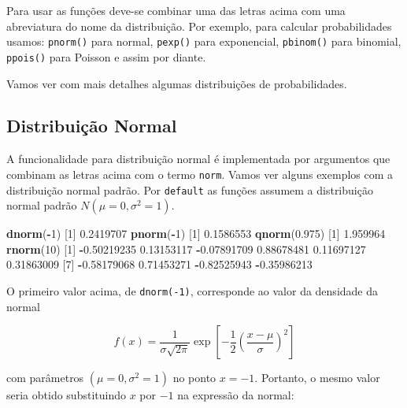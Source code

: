 \documentclass[10pt,a4paper]{book}
\newenvironment{Shaded}{\begin{snugshade}}{\end{snugshade}}
\newcommand{\KeywordTok}[1]{\textcolor[rgb]{0.13,0.29,0.53}{\textbf{#1}}}
\newcommand{\DecValTok}[1]{\textcolor[rgb]{0.00,0.00,0.81}{#1}}
\newcommand{\FloatTok}[1]{\textcolor[rgb]{0.00,0.00,0.81}{#1}}
\newcommand{\OperatorTok}[1]{\textcolor[rgb]{0.81,0.36,0.00}{\textbf{#1}}}
\newcommand{\NormalTok}[1]{#1}
\begin{document}
Para usar as funções deve-se combinar uma das letras acima com uma
abreviatura do nome da distribuição. Por exemplo, para calcular
probabilidades usamos: \texttt{pnorm()} para normal, \texttt{pexp()}
para exponencial, \texttt{pbinom()} para binomial, \texttt{ppois()} para
Poisson e assim por diante.

Vamos ver com mais detalhes algumas distribuições de probabilidades.

\subsection{Distribuição Normal}\label{distribuiuxe7uxe3o-normal}

A funcionalidade para distribuição normal é implementada por argumentos
que combinam as letras acima com o termo \texttt{norm}. Vamos ver alguns
exemplos com a distribuição normal padrão. Por \texttt{default} as
funções assumem a distribuição normal padrão \(N(\mu=0, \sigma^2=1)\).

\begin{Shaded}
\begin{Highlighting}[]
\KeywordTok{dnorm}\NormalTok{(}\OperatorTok{-}\DecValTok{1}\NormalTok{)}
\NormalTok{[}\DecValTok{1}\NormalTok{] }\FloatTok{0.2419707}
\KeywordTok{pnorm}\NormalTok{(}\OperatorTok{-}\DecValTok{1}\NormalTok{)}
\NormalTok{[}\DecValTok{1}\NormalTok{] }\FloatTok{0.1586553}
\KeywordTok{qnorm}\NormalTok{(}\FloatTok{0.975}\NormalTok{)}
\NormalTok{[}\DecValTok{1}\NormalTok{] }\FloatTok{1.959964}
\KeywordTok{rnorm}\NormalTok{(}\DecValTok{10}\NormalTok{)}
\NormalTok{ [}\DecValTok{1}\NormalTok{] }\OperatorTok{-}\FloatTok{0.50219235}  \FloatTok{0.13153117} \OperatorTok{-}\FloatTok{0.07891709}  \FloatTok{0.88678481}  \FloatTok{0.11697127}  \FloatTok{0.31863009}
\NormalTok{ [}\DecValTok{7}\NormalTok{] }\OperatorTok{-}\FloatTok{0.58179068}  \FloatTok{0.71453271} \OperatorTok{-}\FloatTok{0.82525943} \OperatorTok{-}\FloatTok{0.35986213}
\end{Highlighting}
\end{Shaded}

O primeiro valor acima, de \texttt{dnorm(-1)}, corresponde ao valor da
densidade da normal

\[
f(x) = \frac{1}{\sigma\sqrt{2 \pi}}\exp \left[ -\frac{1}{2}
    \left( \frac{x - \mu}{\sigma} \right)^2 \right]
\]

com parâmetros \((\mu=0, \sigma^2=1)\) no ponto \(x = -1\). Portanto, o
mesmo valor seria obtido substituindo \(x\) por \(-1\) na expressão da
normal:
\end{document}
